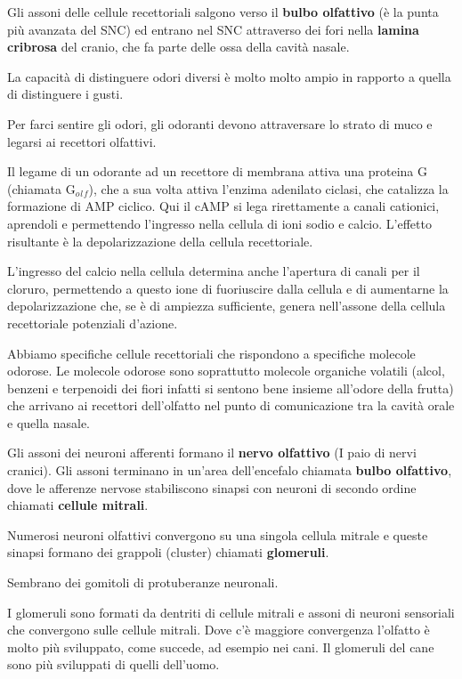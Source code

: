 \documentclass[]{article}
\begin{document}
Gli assoni delle cellule recettoriali salgono verso il \textbf{bulbo
olfattivo} (è la punta più avanzata del SNC) ed entrano nel SNC
attraverso dei fori nella \textbf{lamina cribrosa} del cranio, che fa
parte delle ossa della cavità nasale.

La capacità di distinguere odori diversi è molto molto ampio in rapporto
a quella di distinguere i gusti.

Per farci sentire gli odori, gli odoranti devono attraversare lo strato
di muco e legarsi ai recettori olfattivi.

Il legame di un odorante ad un recettore di membrana attiva una proteina
G (chiamata G\(_o\)\(_l\)\(_f\)), che a sua volta attiva l'enzima
adenilato ciclasi, che catalizza la formazione di AMP ciclico. Qui il
cAMP si lega rirettamente a canali cationici, aprendoli e permettendo
l'ingresso nella cellula di ioni sodio e calcio. L'effetto risultante è
la depolarizzazione della cellula recettoriale.

L'ingresso del calcio nella cellula determina anche l'apertura di canali
per il cloruro, permettendo a questo ione di fuoriuscire dalla cellula e
di aumentarne la depolarizzazione che, se è di ampiezza sufficiente,
genera nell'assone della cellula recettoriale potenziali d'azione.

Abbiamo specifiche cellule recettoriali che rispondono a specifiche
molecole odorose. Le molecole odorose sono soprattutto molecole
organiche volatili (alcol, benzeni e terpenoidi dei fiori infatti si
sentono bene insieme all'odore della frutta) che arrivano ai recettori
dell'olfatto nel punto di comunicazione tra la cavità orale e quella
nasale.

Gli assoni dei neuroni afferenti formano il \textbf{nervo olfattivo} (I
paio di nervi cranici). Gli assoni terminano in un'area dell'encefalo
chiamata \textbf{bulbo olfattivo}, dove le afferenze nervose
stabiliscono sinapsi con neuroni di secondo ordine chiamati
\textbf{cellule mitrali}.

Numerosi neuroni olfattivi convergono su una singola cellula mitrale e
queste sinapsi formano dei grappoli (cluster) chiamati
\textbf{glomeruli}.

Sembrano dei gomitoli di protuberanze neuronali.

I glomeruli sono formati da dentriti di cellule mitrali e assoni di
neuroni sensoriali che convergono sulle cellule mitrali. Dove c'è
maggiore convergenza l'olfatto è molto più sviluppato, come succede, ad
esempio nei cani. Il glomeruli del cane sono più sviluppati di quelli
dell'uomo.
\end{document}
